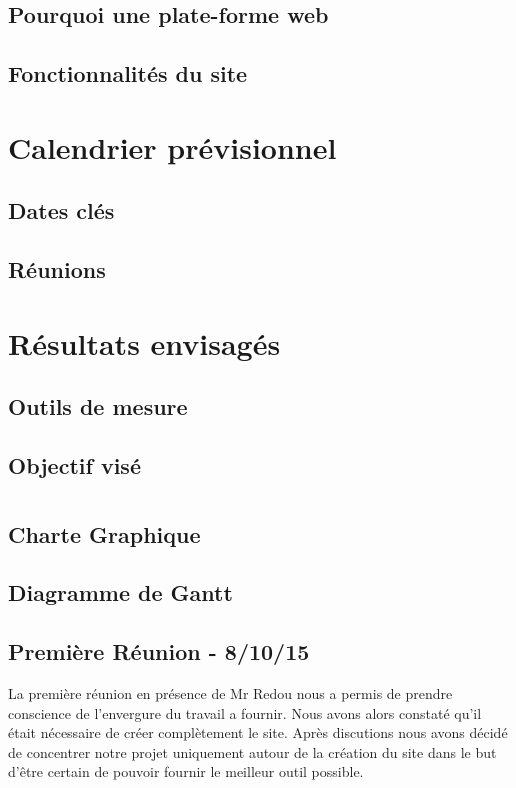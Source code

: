 \documentclass{report}
\begin{document}
\section{Pourquoi une plate-forme web}
\section{Fonctionnalités du site}

\chapter{Calendrier prévisionnel}
\section{Dates clés}
\section{Réunions}

\chapter{Résultats envisagés}
\section{Outils de mesure}
\section{Objectif visé}

\newpage
\appendix
\chapter{}
\section{Charte Graphique}
\section{Diagramme de Gantt}
\newpage
\section{Première Réunion - 8/10/15}
La première réunion en présence de Mr Redou nous a permis de prendre conscience de l'envergure du travail a fournir. Nous avons alors constaté qu'il était nécessaire de créer complètement le site. Après discutions nous avons décidé de concentrer notre projet uniquement autour de la création du site dans le but d’être certain de pouvoir fournir le meilleur outil possible.
\end{document}
